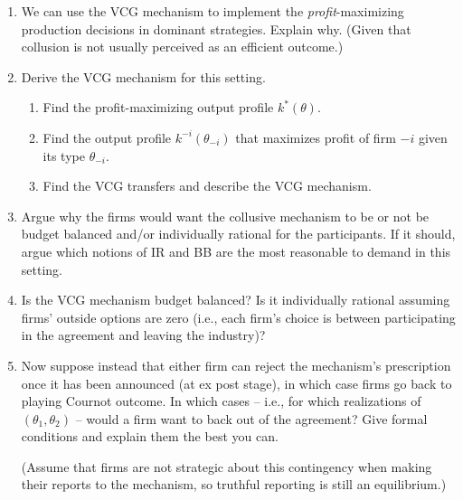 \documentclass[a4paper]{article}
\begin{document}
\medskip
\begin{enumerate}
	\item We can use the VCG mechanism to implement the \emph{profit}-maximizing production decisions in dominant strategies.
	Explain why. (Given that collusion is not usually perceived as an efficient outcome.)
	\item Derive the VCG mechanism for this setting.
	\begin{enumerate}
		\item Find the profit-maximizing output profile $k^*(\theta)$.
		\item Find the output profile $k^{-i}(\theta_{-i})$ that maximizes profit of firm $-i$ given its type $\theta_{-i}$.
		\item Find the VCG transfers and describe the VCG mechanism.
	\end{enumerate}
	\item \label{part:irbb} Argue why the firms would want the collusive mechanism to be or not be budget balanced and/or individually rational for the participants. If it should, argue which notions of IR and BB are the most reasonable to demand in this setting.
	\item Is the VCG mechanism budget balanced? Is it individually rational assuming firms' outside options are zero (i.e., each firm's choice is between participating in the agreement and leaving the industry)?
	\item Now suppose instead that either firm can reject the mechanism's prescription once it has been announced (at ex post stage), in which case firms go back to playing Cournot outcome. In which cases -- i.e., for which realizations of $(\theta_1,\theta_2)$ -- would a firm want to back out of the agreement? Give formal conditions and explain them the best you can.
	
	(Assume that firms are not strategic about this contingency when making their reports to the mechanism, so truthful reporting is still an equilibrium.)
\end{enumerate}
\end{document}
